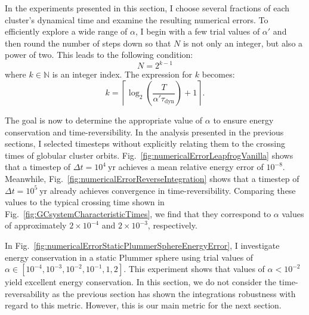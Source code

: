         In the experiments presented in this section, I choose several fractions of each cluster's dynamical time and examine the resulting numerical errors. To efficiently explore a wide range of $\alpha$, I begin with a few trial values of $\alpha'$ and then round the number of steps down so that $N$ is not only an integer, but also a power of two. This leads to the following condition:
        \begin{equation}
            N = 2^{k-1}
        \end{equation}
        where $k \in \mathbb{N}$ is an integer index. The expression for $k$ becomes:
        \begin{equation} 
            k = \left\lceil \log_2\left(\frac{T}{\alpha '  \tau_\mathrm{dyn}}\right) + 1  \right\rceil.
            \label{eq:binary_time_step_criterion}
        \end{equation}
        
        The goal is now to determine the appropriate value of $\alpha$ to ensure energy conservation and time-reversibility. In the analysis presented in the previous sections, I selected timesteps without explicitly relating them to the crossing times of globular cluster orbits. Fig.~\ref{fig:numericalErrorLeapfrogVanilla} shows that a timestep of $\Delta t = 10^4~\mathrm{yr}$ achieves a mean relative energy error of $10^{-8}$. Meanwhile, Fig.~\ref{fig:numericalErrorReverseIntegration} shows that a timestep of $\Delta t = 10^5~\mathrm{yr}$ already achieves convergence in time-reversibility. Comparing these values to the typical crossing time shown in Fig.~\ref{fig:GCsystemCharacteristicTimes}, we find that they correspond to $\alpha$ values of approximately $2 \times 10^{-4}$ and $2 \times 10^{-3}$, respectively.

        In Fig.~\ref{fig:numericalErrorStaticPlummerSphereEnergyError}, I investigate energy conservation in a static Plummer sphere using trial values of $\alpha \in [10^{-4}, 10^{-3}, 10^{-2}, 10^{-1}, 1, 2]$. This experiment shows that values of $\alpha < 10^{-2}$ yield excellent energy conservation. In this section, we do not consider the time-reversability as the previous section has shown the integrations robustness with regard to this metric. However, this is our main metric for the next section.

